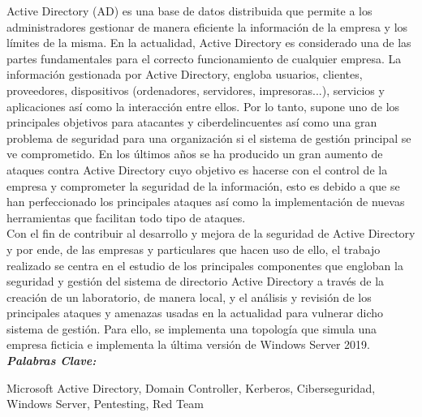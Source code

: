 
\setcounter{page}{5}
	
Active Directory (AD) es una base de datos distribuida que permite a los administradores gestionar de manera eficiente la información de la empresa y los límites de la misma. En la actualidad, Active Directory es considerado una de las partes fundamentales para el correcto funcionamiento de cualquier empresa. La información gestionada por Active Directory, engloba usuarios, clientes, proveedores, dispositivos (ordenadores, servidores, impresoras...), servicios y aplicaciones así como la interacción entre ellos. Por lo tanto, supone uno de los principales objetivos para atacantes y ciberdelincuentes así como una gran problema de seguridad para una organización si el sistema de gestión principal se ve comprometido. En los últimos años se ha producido un gran aumento de ataques contra Active Directory cuyo objetivo es hacerse con el control de la empresa y comprometer la seguridad de la información, esto es debido a que se han perfeccionado los principales ataques así como la implementación de nuevas herramientas que facilitan todo tipo de ataques. \\

Con el fin de contribuir al desarrollo y mejora de la seguridad de Active Directory y por ende, de las empresas y particulares que hacen uso de ello, el trabajo realizado se centra en el estudio de los principales componentes que engloban la seguridad y gestión del sistema de directorio Active Directory a través de la creación de un laboratorio, de manera local, y el análisis y revisión de los principales ataques y amenazas usadas en la actualidad para vulnerar dicho sistema de gestión. Para ello, se implementa una topología que simula una empresa ficticia e implementa la última versión de Windows Server 2019.\\ 

\textit{\textbf{Palabras Clave:}}

Microsoft Active Directory, Domain Controller, Kerberos, Ciberseguridad, Windows Server, Pentesting, Red Team
	
		
\vfill
\newpage %
\thispagestyle{empty}
\mbox{}
